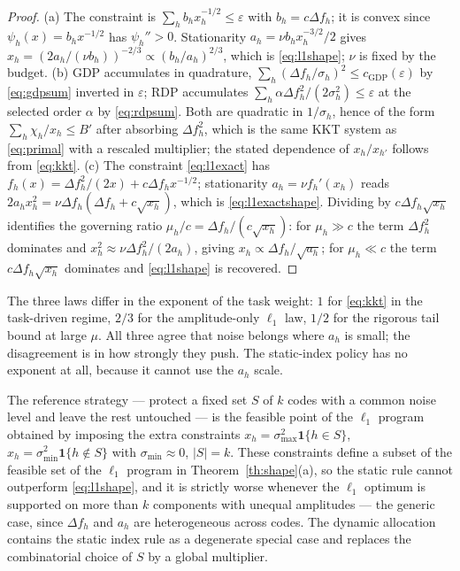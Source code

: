 \begin{proof}
(a) The constraint is $\sum_hb_hx_h^{-1/2}\le\varepsilon$ with
$b_h=c\Delta f_h$; it is convex since $\psi_h(x)=b_hx^{-1/2}$ has
$\psi_h''>0$. Stationarity $a_h=\nu b_hx_h^{-3/2}/2$ gives
$x_h=(2a_h/(\nu b_h))^{-2/3}\propto(b_h/a_h)^{2/3}$, which is
\eqref{eq:l1shape}; $\nu$ is fixed by the budget.
(b) GDP accumulates in quadrature,
$\sum_h(\Delta f_h/\sigma_h)^{2}\le c_{\mathrm{GDP}}(\varepsilon)$ by
\eqref{eq:gdpsum} inverted in $\varepsilon$; RDP accumulates
$\sum_h\alpha\Delta f_h^2/(2\sigma_h^2)\le\varepsilon$ at the selected order
$\alpha$ by \eqref{eq:rdpsum}. Both are quadratic in $1/\sigma_h$, hence of
the form $\sum_h\chi_h/x_h\le B'$ after absorbing $\Delta f_h^2$, which is the
same KKT system as \eqref{eq:primal} with a rescaled multiplier; the stated
dependence of $x_h/x_{h'}$ follows from \eqref{eq:kkt}.
(c) The constraint \eqref{eq:l1exact} has
$f_h(x)=\Delta f_h^2/(2x)+c\Delta f_hx^{-1/2}$; stationarity
$a_h=\nu f_h'(x_h)$ reads
$2a_hx_h^2=\nu\Delta f_h(\Delta f_h+c\sqrt{x_h})$, which is
\eqref{eq:l1exactshape}. Dividing by $c\Delta f_h\sqrt{x_h}$ identifies the
governing ratio $\mu_h/c=\Delta f_h/(c\sqrt{x_h})$: for $\mu_h\gg c$ the term
$\Delta f_h^2$ dominates and $x_h^2\approx\nu\Delta f_h^2/(2a_h)$, giving
$x_h\propto\Delta f_h/\sqrt{a_h}$; for $\mu_h\ll c$ the term
$c\Delta f_h\sqrt{x_h}$ dominates and \eqref{eq:l1shape} is recovered.
\end{proof}

\begin{remark}
\label{rm:exponents}
The three laws differ in the exponent of the task weight: $1$ for
\eqref{eq:kkt} in the task-driven regime, $2/3$ for the amplitude-only
$\ell_1$ law, $1/2$ for the rigorous tail bound at large $\mu$. All three agree
that noise belongs where $a_h$ is small; the disagreement is in how strongly
they push. The static-index policy has no exponent at all, because it cannot
use the $a_h$ scale.
\end{remark}

\begin{corollary}
\label{co:static}
The reference strategy --- protect a fixed set $S$ of $k$ codes with a common
noise level and leave the rest untouched --- is the feasible point of the
$\ell_1$ program obtained by imposing the extra constraints
$x_h=\sigma_{\max}^{2}\mathbf 1\{h\in S\}$,
$x_h=\sigma_{\min}^{2}\mathbf 1\{h\notin S\}$ with
$\sigma_{\min}\approx0$, $|S|=k$. These constraints define a subset of the
feasible set of the $\ell_1$ program in Theorem~\ref{th:shape}(a), so the
static rule cannot outperform
\eqref{eq:l1shape}, and it is strictly worse whenever the $\ell_1$ optimum is
supported on more than $k$ components with unequal amplitudes --- the generic
case, since $\Delta f_h$ and $a_h$ are heterogeneous across codes. The dynamic
allocation contains the static index rule as a degenerate special case and
replaces the combinatorial choice of $S$ by a global multiplier.
\end{corollary}

